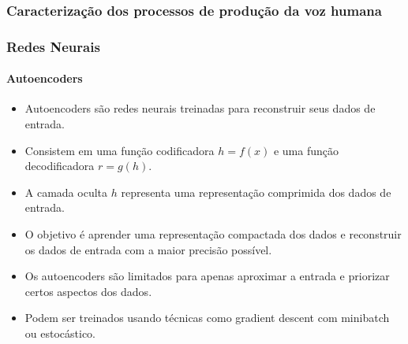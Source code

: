 \documentclass{beamer}
\begin{document}
	\begin{frame}
		\frametitle{Caracterização dos processos de produção da voz humana}
	\end{frame}

	\begin{frame}
		\frametitle{Redes Neurais}
		\framesubtitle{Autoencoders}
		\begin{itemize}
			\item Autoencoders são redes neurais treinadas para reconstruir seus dados de entrada.
			\item Consistem em uma função codificadora $h = f(x)$ e uma função decodificadora $r = g(h)$.
			\item A camada oculta $h$ representa uma representação comprimida dos dados de entrada.
			\item O objetivo é aprender uma representação compactada dos dados e reconstruir os dados de entrada com a maior precisão possível.
			\item Os autoencoders são limitados para apenas aproximar a entrada e priorizar certos aspectos dos dados.
			\item Podem ser treinados usando técnicas como gradient descent com minibatch ou estocástico.
		\end{itemize}
	\end{frame}
	
\end{document}

